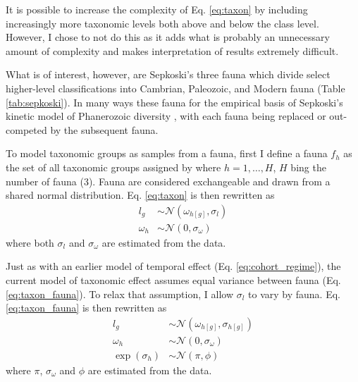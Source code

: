 \documentclass[12pt,letterpaper]{article}
\begin{document}
It is possible to increase the complexity of Eq. \ref{eq:taxon} by including increasingly more taxonomic levels both above and below the class level. However, I chose to not do this as it adds what is probably an unnecessary amount of complexity and makes interpretation of results extremely difficult.

What is of interest, however, are Sepkoski's three fauna \citep{SepkoskiJr.1981a} which divide select higher-level classifications into Cambrian, Paleozoic, and Modern fauna (Table \ref{tab:sepkoski}). In many ways these fauna for the empirical basis of Sepkoski's kinetic model of Phanerozoic diversity \citep{Sepkoski1978,Sepkoski1979,Sepkoski1984}, with each fauna being replaced or out-competed by the subsequent fauna. %

To model taxonomic groups as samples from a fauna, first I define a fauna \(f_{h}\) as the set of all taxonomic groups assigned by \citet{SepkoskiJr.1981a} where \(h = 1, \dots, H\), \(H\) bing the number of fauna (3). Fauna are considered exchangeable and drawn from a shared normal distribution. Eq. \ref{eq:taxon} is then rewritten as
\begin{equation}
  \begin{aligned}
    l_{g} &\sim \mathcal{N}(\omega_{h[g]}, \sigma_{l})\\
    \omega_{h} &\sim \mathcal{N}(0, \sigma_{\omega})
  \end{aligned}
  \label{eq:taxon_fauna}
\end{equation}
where both \(\sigma_{l}\) and \(\sigma_{\omega}\) are estimated from the data.

Just as with an earlier model of temporal effect (Eq. \ref{eq:cohort_regime}), the current model of taxonomic effect assumes equal variance between fauna (Eq. \ref{eq:taxon_fauna}). To relax that assumption, I allow \(\sigma_{l}\) to vary by fauna. Eq. \ref{eq:taxon_fauna} is then rewritten as
\begin{equation}
  \begin{aligned}
    l_{g} &\sim \mathcal{N}(\omega_{h[g]}, \sigma_{h[g]})\\
    \omega_{h} &\sim \mathcal{N}(0, \sigma_{\omega}) \\
    \exp(\sigma_{h}) &\sim \mathcal{N}(\pi, \phi)
  \end{aligned}
  \label{eq:taxon_complex}
\end{equation}
where \(\pi\), \(\sigma_{\omega}\) and \(\phi\) are estimated from the data.
\end{document}
